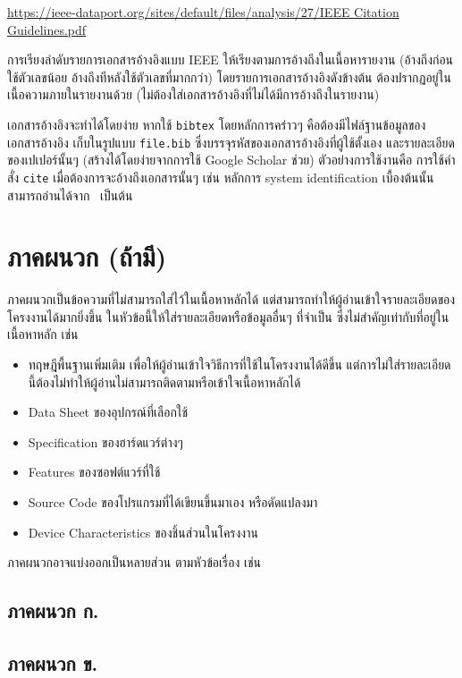 \documentclass[11pt,a4paper]{article}
\begin{document}
\url{https://ieee-dataport.org/sites/default/files/analysis/27/IEEE Citation Guidelines.pdf}

การเรียงลำดับรายการเอกสารอ้างอิงแบบ IEEE ให้เรียงตามการอ้างถึงในเนื้อหารายงาน (อ้างถึงก่อนใช้ตัวเลขน้อย อ้างถึงทีหลังใช้ตัวเลขที่มากกว่า) โดยรายการเอกสารอ้างอิงดังข้างต้น ต้องปรากฏอยู่ในเนื้อความภายในรายงานด้วย (ไม่ต้องใส่เอกสารอ้างอิงที่ไม่ได้มีการอ้างถึงในรายงาน)


เอกสารอ้างอิงจะทำได้โดยง่าย หากใช้ \texttt{bibtex} โดยหลักการคร่าวๆ คือต้องมีไฟล์ฐานข้อมูลของเอกสารอ้างอิง เก็บในรูปแบบ \texttt{file.bib} ซึ่งบรรจุรหัสของเอกสารอ้างอิงที่ผู้ใช้ตั้งเอง และรายละเอียดของเปเปอร์นั้นๆ (สร้างได้โดยง่ายจากการใช้ Google Scholar ช่วย) ตัวอย่างการใช้งานคือ การใช้คำสั่ง \texttt{cite} เมื่อต้องการจะอ้างถึงเอกสารนั้นๆ เช่น หลักการ system identification เบื้องต้นนั้นสามารถอ่านได้จาก~\cite{SoS:89} เป็นต้น




\section{ภาคผนวก (ถ้ามี)}
ภาคผนวกเป็นข้อความที่ไม่สามารถใส่ไว้ในเนื้อหาหลักได้ แต่สามารถทำให้ผู้อ่านเข้าใจรายละเอียดของโครงงานได้มากยิ่งขึ้น ในหัวข้อนี้ให้ใส่รายละเอียดหรือข้อมูลอื่นๆ ที่จำเป็น ซึ่งไม่สำคัญเท่ากับที่อยู่ในเนื้อหาหลัก เช่น

\begin{itemize}
    \item ทฤษฎีพื้นฐานเพิ่มเติม เพื่อให้ผู้อ่านเข้าใจวิธีการที่ใช้ในโครงงานได้ดีขึ้น แต่การไม่ใส่รายละเอียดนี้ต้องไม่ทำให้ผู้อ่านไม่สามารถติดตามหรือเข้าใจเนื้อหาหลักได้
    \item Data Sheet ของอุปกรณ์ที่เลือกใช้
    \item Specification ของฮาร์ดแวร์ต่างๆ
    \item Features ของซอฟต์แวร์ที่ใช้
    \item Source Code ของโปรแกรมที่ได้เขียนขึ้นมาเอง หรือดัดแปลงมา
    \item Device Characteristics ของชิ้นส่วนในโครงงาน
\end{itemize}

ภาคผนวกอาจแบ่งออกเป็นหลายส่วน ตามหัวข้อเรื่อง เช่น

\subsection{ภาคผนวก ก.}

\subsection{ภาคผนวก ข.}
\end{document}
